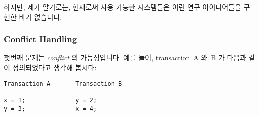 하지만, 제가 알기로는, 현재로써 사용 가능한 시스템들은 이런 연구 아이디어들을
구현한 바가 없습니다.
\iffalse

\emph{Unbounded transactional memory} (UTM)
schemes~\cite{CScottAnanian2006,KevinEMoore2006}
use DRAM as an extremely large victim cache, but integrating such schemes
into a production-quality cache-coherence mechanism is still an unsolved
problem.
In addition, use of DRAM as a victim cache may have unfortunate
performance and energy-efficiency consequences, particularly
if the victim cache is to be fully associative.
Finally, the ``unbounded'' aspect of UTM assumes that all of DRAM
could be used as a victim cache, while in reality
the large but still fixed amount of DRAM assigned to a given CPU
would limit the size of that CPU's transactions.
Other schemes use a combination of hardware and software transactional
memory~\cite{SanjeevKumar2006} and one could imagine using STM as a
fallback mechanism for HTM.

However, to the best of my knowledge, currently available systems do
not implement any of these research ideas, and perhaps for good reason.
\fi

\subsubsection{Conflict Handling}
\label{sec:future:Conflict Handling}

첫번째 문제는 \emph{conflict} 의 가능성입니다.
예를 들어, transaction~A 와~B 가 다음과 같이 정의되었다고 생각해 봅시다:
\iffalse

The first complication is the possibility of \emph{conflicts}.
For example, suppose that transactions~A and~B are defined as follows:
\fi

\vspace{5pt}
\begin{minipage}[t]{\columnwidth}
\begin{verbatim}
Transaction A       Transaction B

x = 1;              y = 2;
y = 3;              x = 4;
\end{verbatim}
\end{minipage}
\vspace{5pt}

